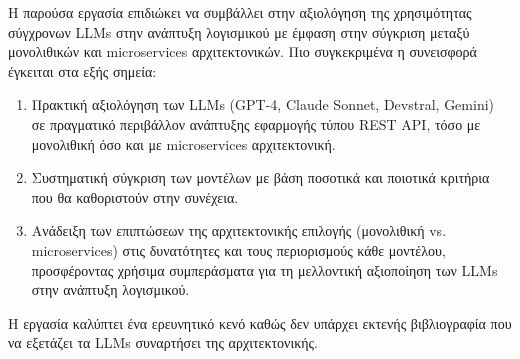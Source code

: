 Η παρούσα εργασία επιδιώκει να συμβάλλει στην αξιολόγηση της χρησιμότητας σύγχρονων LLMs στην ανάπτυξη λογισμικού με έμφαση στην σύγκριση μεταξύ μονολιθικών και microservices αρχιτεκτονικών.
Πιο συγκεκριμένα η συνεισφορά έγκειται στα εξής σημεία:

\begin{enumerate}
    \item Πρακτική αξιολόγηση των LLMs (GPT-4, Claude Sonnet, Devstral, Gemini) σε πραγματικό περιβάλλον ανάπτυξης εφαρμογής τύπου REST API, τόσο με μονολιθική όσο και με microservices αρχιτεκτονική.
    
    \item Συστηματική σύγκριση των μοντέλων με βάση ποσοτικά και ποιοτικά κριτήρια που θα καθοριστούν στην συνέχεια.
    
    \item Ανάδειξη των επιπτώσεων της αρχιτεκτονικής επιλογής (μονολιθική vs. microservices) στις δυνατότητες και τους περιορισμούς κάθε μοντέλου, προσφέροντας χρήσιμα συμπεράσματα για τη μελλοντική αξιοποίηση των LLMs στην ανάπτυξη λογισμικού.
\end{enumerate}

\vspace{1em}

Η εργασία καλύπτει ένα ερευνητικό κενό καθώς δεν υπάρχει εκτενής βιβλιογραφία που να εξετάζει τα LLMs συναρτήσει της αρχιτεκτονικής.





